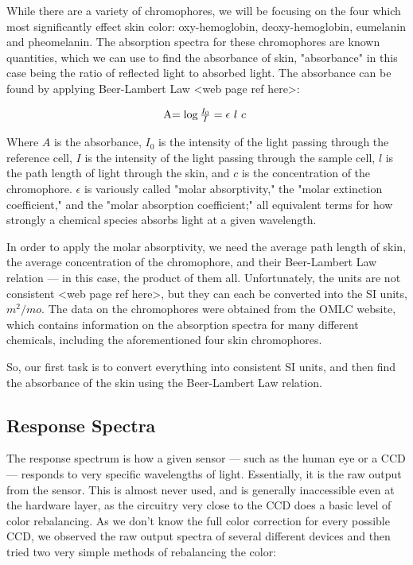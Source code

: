 While there are a variety of chromophores, we will be focusing on the four which most significantly effect skin color: oxy-hemoglobin, deoxy-hemoglobin, eumelanin and pheomelanin. The absorption spectra for these chromophores are known quantities, which we can use to find the absorbance of skin, "absorbance" in this case being the ratio of reflected light to absorbed light. The absorbance can be found by applying Beer-Lambert Law <web page ref here>:

\begin{equation}\label{eq:BeerLambert}
$A$ = \log \frac{I_{0}}{I} = \epsilon $ $ l $ $ c $ $
\end{equation}

Where $A$ is the absorbance, $I_{0}$ is the intensity of the light passing through the reference cell, $I$ is the intensity of the light passing through the sample cell, $l$ is the path length of light through the skin, and $c$ is the concentration of the chromophore. $\epsilon$ is variously called "molar absorptivity," the "molar extinction coefficient," and the "molar absorption coefficient;" all equivalent terms for how strongly a chemical species absorbs light at a given wavelength.

In order to apply the molar absorptivity, we need the average path length of skin, the average concentration of the chromophore, and their Beer-Lambert Law relation --- in this case, the product of them all. Unfortunately, the units are not consistent <web page ref here>, but they can each be converted into the SI units, $m^{2}/mo$. The data on the chromophores were obtained from the OMLC website, which contains information on the absorption spectra for many different chemicals, including the aforementioned four skin chromophores. 

So, our first task is to convert everything into consistent SI units, and then find the absorbance of the skin using the Beer-Lambert Law relation.

\subsection{Response Spectra}

The response spectrum is how a given sensor --- such as the human eye or a CCD --- responds to very specific wavelengths of light. Essentially, it is the raw output from the sensor. This is almost never used, and is generally inaccessible even at the hardware layer, as the circuitry very close to the CCD does a basic level of color rebalancing. As we don't know the full color correction for every possible CCD, we observed the raw output spectra of several different devices and then tried two very simple methods of rebalancing the color:


